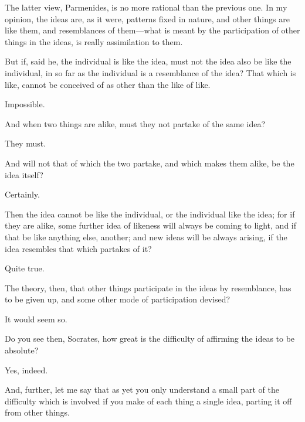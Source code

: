 \documentclass[11pt,letter]{article}
\begin{document}
\par  The latter view, Parmenides, is no more rational than the previous one. In my opinion, the ideas are, as it were, patterns fixed in nature, and other things are like them, and resemblances of them—what is meant by the participation of other things in the ideas, is really assimilation to them.

\par  But if, said he, the individual is like the idea, must not the idea also be like the individual, in so far as the individual is a resemblance of the idea? That which is like, cannot be conceived of as other than the like of like.

\par  Impossible.

\par  And when two things are alike, must they not partake of the same idea?

\par  They must.

\par  And will not that of which the two partake, and which makes them alike, be the idea itself?

\par  Certainly.

\par  Then the idea cannot be like the individual, or the individual like the idea; for if they are alike, some further idea of likeness will always be coming to light, and if that be like anything else, another; and new ideas will be always arising, if the idea resembles that which partakes of it?

\par  Quite true.

\par  The theory, then, that other things participate in the ideas by resemblance, has to be given up, and some other mode of participation devised?

\par  It would seem so.

\par  Do you see then, Socrates, how great is the difficulty of affirming the ideas to be absolute?

\par  Yes, indeed.

\par  And, further, let me say that as yet you only understand a small part of the difficulty which is involved if you make of each thing a single idea, parting it off from other things.
\end{document}
